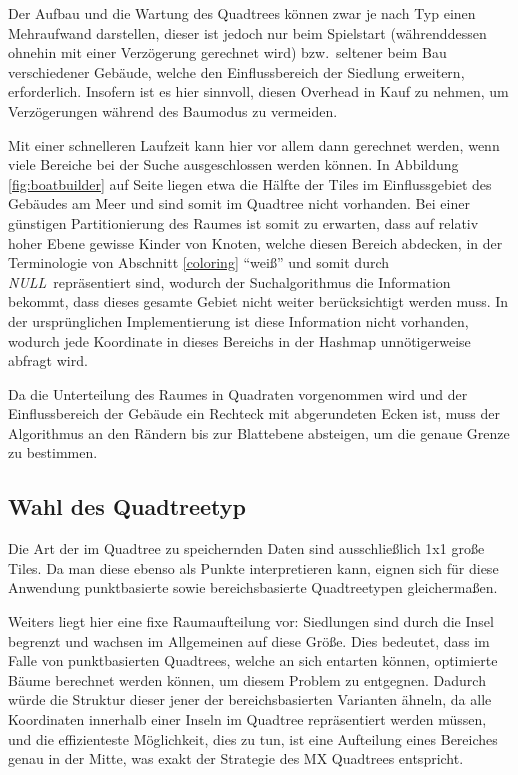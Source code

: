 \documentclass[%
			paper=a4,%
			DIV12,
			liststotoc,
			bibtotoc,
			draft=false,%
			titlepage
			]{scrartcl}
\newcommand{\mynull}{\textit{NULL}}
\begin{document}
Der Aufbau und die Wartung des Quadtrees können zwar je nach Typ einen Mehraufwand darstellen, dieser ist jedoch nur beim Spielstart (währenddessen ohnehin mit einer Verzögerung gerechnet wird) bzw.\ seltener beim Bau verschiedener Gebäude, welche den Einflussbereich der Siedlung erweitern, erforderlich.
Insofern ist es hier sinnvoll, diesen Overhead in Kauf zu nehmen, um Verzögerungen während des Baumodus zu vermeiden.

Mit einer schnelleren Laufzeit kann hier vor allem dann gerechnet werden, wenn viele Bereiche bei der Suche ausgeschlossen werden können.
In Abbildung \ref{fig:boatbuilder} auf Seite \pageref{fig:boatbuilder} liegen etwa die Hälfte der Tiles im Einflussgebiet des Gebäudes am Meer und sind somit im Quadtree nicht vorhanden.
Bei einer günstigen Partitionierung des Raumes ist somit zu erwarten, dass auf relativ hoher Ebene gewisse Kinder von Knoten, welche diesen Bereich abdecken, in der Terminologie von Abschnitt \ref{coloring} "`weiß"' und somit durch \mynull\ repräsentiert sind, wodurch der Suchalgorithmus die Information bekommt, dass dieses gesamte Gebiet nicht weiter berücksichtigt werden muss.
In der ursprünglichen Implementierung ist diese Information nicht vorhanden, wodurch jede Koordinate in dieses Bereichs in der Hashmap unnötigerweise abfragt wird.

Da die Unterteilung des Raumes in Quadraten vorgenommen wird und der Einflussbereich der Gebäude ein Rechteck mit abgerundeten Ecken ist, 
muss der Algorithmus an den Rändern bis zur Blattebene absteigen, um die genaue Grenze zu bestimmen.

\subsection{Wahl des Quadtreetyp}

Die Art der im Quadtree zu speichernden Daten sind ausschließlich 1x1 große Tiles. Da man diese ebenso als Punkte interpretieren kann, eignen sich für diese Anwendung punktbasierte sowie bereichsbasierte Quadtreetypen gleichermaßen.

Weiters liegt hier eine fixe Raumaufteilung vor:
Siedlungen sind durch die Insel begrenzt und wachsen im Allgemeinen auf diese Größe.
Dies bedeutet, dass im Falle von punktbasierten Quadtrees, welche an sich entarten können, optimierte Bäume berechnet werden können, um diesem Problem zu entgegnen.
Dadurch würde die Struktur dieser jener der bereichsbasierten Varianten ähneln, da alle Koordinaten innerhalb einer Inseln im Quadtree repräsentiert werden müssen, und die effizienteste Möglichkeit, dies zu tun, ist eine Aufteilung eines Bereiches genau in der Mitte, was exakt der Strategie des MX Quadtrees entspricht.
\end{document}
